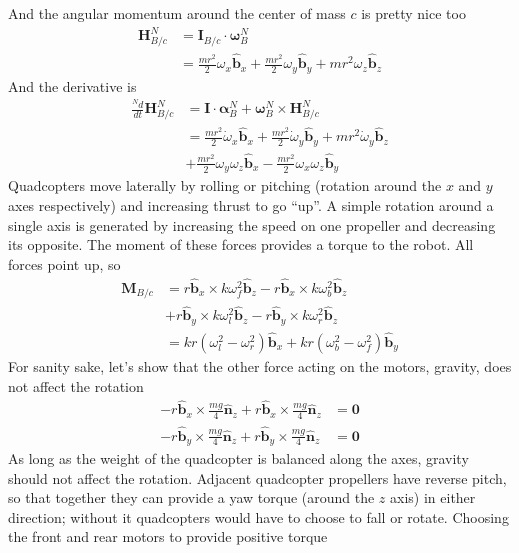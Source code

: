 \documentclass[lettersize,journal]{IEEEtran}
\begin{document}
And the angular momentum around the center of mass $c$ is pretty nice too
\begin{align}
  {\mathbf{H}^N_{B/c}}
  &= \mathbf{I}_{B/c} \cdot \boldsymbol\omega_B^N\nonumber \\
  &= \frac{mr^2}{2}\omega_x\mathbf{\hat{b}}_x + \frac{mr^2}{2}\omega_y\mathbf{\hat{b}}_y + mr^2\omega_z \mathbf{\hat{b}}_z
\end{align}
And the derivative is
\begin{align}
  \frac{^Nd}{dt}\mathbf{H}^N_{B/c} &= \mathbf{I}\cdot\boldsymbol\alpha^N_B + \boldsymbol\omega^N_B \times \mathbf{H}^N_{B/c} \nonumber\\
  &= \frac{mr^2}{2}\dot\omega_x \mathbf{\hat{b}}_x + \frac{mr^2}{2}\dot\omega_y \mathbf{\hat{b}}_y + mr^2\dot\omega_y \mathbf{\hat{b}}_z \nonumber \\ 
  &+\frac{mr^2}{2}\omega_y \omega_z \mathbf{\hat{b}}_x - \frac{mr^2}{2} \omega_x\omega_z \mathbf{\hat{b}}_y \label{EQN:AngMomDer}
\end{align}
Quadcopters move laterally by rolling or pitching (rotation around the $x$ and $y$ axes respectively) and increasing thrust to go ``up''. A simple rotation around a single axis is generated by increasing the speed on one propeller and decreasing its opposite. The moment of these forces provides a torque to the robot. All forces point up, so
\begin{align}
  \mathbf{M}_{B/c} &= r \mathbf{\hat{b}}_x \times k\omega_f^2 \mathbf{\hat{b}}_z - r\mathbf{\hat{b}}_x \times k\omega_b^2 \mathbf{\hat{b}}_z \nonumber \\
  &+ r\mathbf{\hat{b}}_y\times k\omega_l^2 \mathbf{\hat{b}}_z  - r\mathbf{\hat{b}}_y \times k\omega_r^2 \mathbf{\hat{b}}_z\nonumber\\
  &= kr \left(\omega_l^2-\omega_r^2\right) \mathbf{\hat{b}}_x+ kr\left(\omega_b^2-\omega_f^2\right) \mathbf{\hat{b}}_y
\end{align}
For sanity sake, let's show that the other force acting on the motors, gravity, does not affect the rotation
\begin{align}
  -r\mathbf{\hat{b}}_x \times \frac{mg}{4} \mathbf{\hat{n}}_z+r\mathbf{\hat{b}}_x \times \frac{mg}{4} \mathbf{\hat{n}}_z &= \mathbf{0} \nonumber \\
  -r\mathbf{\hat{b}}_y \times \frac{mg}{4} \mathbf{\hat{n}}_z+r\mathbf{\hat{b}}_y \times \frac{mg}{4} \mathbf{\hat{n}}_z	&= \mathbf{0} \nonumber	 
\end{align}
As long as the weight of the quadcopter is balanced along the axes, gravity should not affect the rotation. Adjacent quadcopter propellers have reverse pitch, so that together they can provide a yaw torque (around the $z$ axis) in either direction; without it quadcopters would have to choose to fall or rotate. Choosing the front and rear motors to provide positive torque
\end{document}
